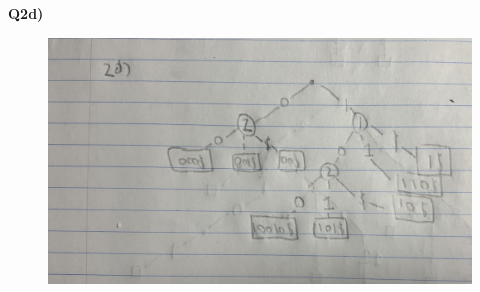 \documentclass[12pt]{article}
\begin{document}
\newpage
\begin{adjustwidth}{0em}{0pt}
\textbf{Q2d)}
\begin{figure}[tbhp]
	\begin{center}
		\includegraphics[width=1\textwidth, angle=0]{2d.jpg}
	\end{center}
\end{figure}
\end{adjustwidth} 
\newpage
\end{document}
